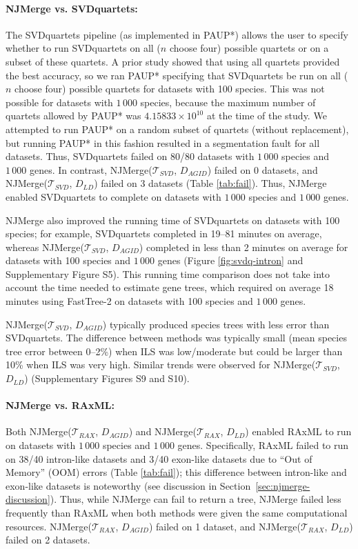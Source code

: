 \paragraph{NJMerge vs. SVDquartets:}
The SVDquartets pipeline (as implemented in PAUP*) allows the user to specify whether to run SVDquartets on all ($n$ choose four) possible quartets or on a subset of these quartets.
A prior study \cite{swenson2011experimental} showed that using all quartets provided the best accuracy, so we ran PAUP* specifying that SVDquartets be run on all ($n$ choose four) possible quartets for datasets with 100 species.
This was not possible for datasets with $1\,000$ species, because 
the maximum number of quartets allowed by PAUP* was $4.15833 \times 10^{10}$ at the time of the study.
We attempted to run PAUP* on a random subset of quartets (without replacement), but running PAUP* in this fashion resulted in a segmentation fault for all datasets.
Thus, SVDquartets failed on 80/80 datasets with $1\,000$ species and $1\,000$ genes.
In contrast, NJMerge($\mathcal{T}_{SVD}$, $D_{AGID}$) failed on 0 datasets, and NJMerge($\mathcal{T}_{SVD}$, $D_{LD}$) failed on 3 datasets (Table \ref{tab:fail}).
Thus, NJMerge enabled SVDquartets to complete on datasets with $1\,000$ species and $1\,000$ genes.

NJMerge also improved the running time of SVDquartets on datasets with 100 species; for example, SVDquartets completed in 19--81 minutes on average, whereas NJMerge($\mathcal{T}_{SVD}$, $D_{AGID}$) completed in less than 2 minutes on average for datasets with 100 species and $1\,000$ genes (Figure \ref{fig:svdq-intron} and Supplementary Figure S5).
This running time comparison does not take into account the time needed to estimate gene trees, which required on average 18 minutes using FastTree-2 on datasets with 100 species and $1\,000$ genes.

NJMerge($\mathcal{T}_{SVD}$, $D_{AGID}$) typically produced species trees with less error than SVDquartets.
The difference between methods was typically small (mean species tree error between 0--2\%)  when ILS was low/moderate but could be larger than 10\% when ILS was very high.
Similar trends were observed for NJMerge($\mathcal{T}_{SVD}$, $D_{LD}$) (Supplementary Figures S9 and S10).


\paragraph{NJMerge vs. RAxML:}
Both NJMerge($\mathcal{T}_{RAX}$, $D_{AGID}$) and NJMerge($\mathcal{T}_{RAX}$, $D_{LD}$) enabled RAxML to run on datasets with $1\,000$ species and $1\,000$ genes.
Specifically, RAxML failed to run on 38/40 intron-like datasets and 3/40 exon-like datasets due to ``Out of Memory'' (OOM) errors (Table \ref{tab:fail}); this difference between intron-like and exon-like datasets is noteworthy (see discussion in Section~\ref{sec:njmerge-discussion}).
Thus, while NJMerge can fail to return a tree, NJMerge failed less frequently than RAxML when both methods were given the same computational resources.
NJMerge($\mathcal{T}_{RAX}$, $D_{AGID}$) failed on 1 dataset, and NJMerge($\mathcal{T}_{RAX}$, $D_{LD}$) failed on 2 datasets.

